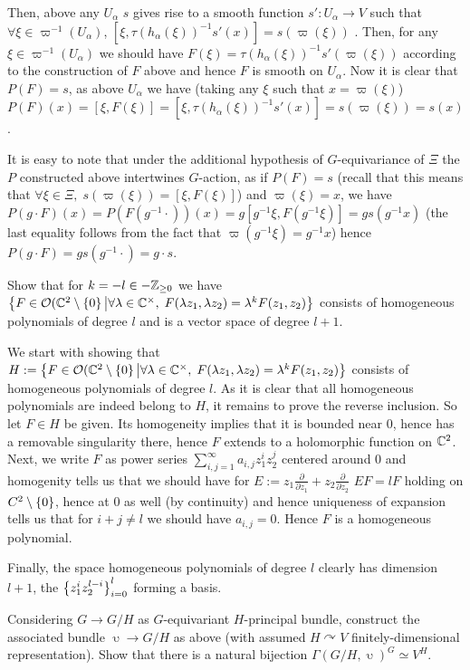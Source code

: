 \documentclass[8pt]{article} %
\newcommand{\myprobshort}[2]{\begin{myprob}[#1]#2\end{myprob}}
\begin{document}
	Then, above any $U_\alpha$ $s$ gives rise to a smooth function $s':U_\alpha\to V$ such that $\forall \xi\in \varpi^{ -1 }
	(U_\alpha)$,
	$[\xi,\tau(h_\alpha(\xi))^{ -1 }s'(x)]=s(\varpi(\xi))$
	. Then, for any $\xi\in\varpi^{ -1 }(U_\alpha)$ we should have
	$F(\xi)=\tau(h_\alpha(\xi))^{ -1 } 
	s'(\varpi(\xi))$ according to the construction of $F$ above and hence $F$ is smooth on $U_\alpha$.
	Now it is clear that $P(F)=s$, as above $U_\alpha$ we have (taking any $\xi$ such that $x=\varpi(\xi)$)
	$P(F)(x)=[\xi,F(\xi)]=[\xi,\tau(h_\alpha(\xi))^{ -1 }s'(x)]=
	s(\varpi(\xi))=s(x)$.\par
 	It is easy to note that under the additional hypothesis of $G$-equivariance of $\Xi$ the $P$ constructed
	above intertwines $G$-action, as if $P(F)=s$ (recall that this means that $\forall \xi\in\Xi,\;s(\varpi(\xi))=[\xi,F(\xi)]
	$)
	and $\varpi(\xi)=x$, we have $P(g\cdot F)(x)=P(F(g^{ -1 }\cdot))(x)=
	g[g^{ -1 }\xi,F(g^{ -1 }\xi)]=gs(g^{ -1 }x)$ (the last equality follows from the fact that $\varpi(g^{ -1 }\xi)=g^{ -1 }x$)
	hence $P(g\cdot F)=gs(g^{ -1 }\cdot)=g\cdot s$.
	\myprobshort{ May 12, Exercise 5.13}{
		Show that for $k=-l\in-\mathbb{Z}_{ \geq0 }$ we have $\left\{ F\in\mathcal{ O }(\mathbb{C}^2\setminus\left\{ 0 \right\} \big| \forall\lambda\in\mathbb{C}^\times,\;F(\lambda z_1,\lambda z_2)=\lambda^{ k }F(z_1,z_2)\right\}$ consists of homogeneous
polynomials of degree $l$ and is a vector space of degree $l+1$.}
We start with showing that 
$H:=\left\{ F\in\mathcal{ O }(\mathbb{C}^2\setminus\left\{ 0 \right\} \big| \forall\lambda\in\mathbb{C}^\times,\;F(\lambda z_1,\lambda z_2)=\lambda^{ k }F(z_1,z_2)\right\}$ consists of homogeneous polynomials of
	degree $l$.
	As it is clear that all homogeneous polynomials are indeed belong to $H$, it remains to prove the reverse inclusion.
	So let $F\in H$ be given. Its homogeneity implies that it is bounded near $0$, hence has a removable singularity there,
	hence $F$ extends to a holomorphic function on $\mathbb{C}^2$. Next, we write $F$ as power series $\sum_{ i,j=1 }^{ \infty }
	a_{ i,j }z_1^iz_2^j$
	centered around $0$ and
	homogenity tells us that we should have for $E:=z_1\frac{ \partial }{ \partial z_1 }+z_2\frac{ \partial }{ \partial z_2 }$
	$EF=lF$ holding on $C^2\setminus\left\{ 0 \right\}$, hence at $0$ as well (by continuity)
	and hence uniqueness of expansion tells us that
	for $i+j\neq l$ we should have $a_{ i,j }=0$. Hence $F$ is a homogeneous polynomial.\par
	Finally, the space homogeneous polynomials of degree $l$ clearly has dimension $l+1$, the $\left\{ z_1^iz_2^{ l-i } \right\}_{ i=0 }
	^l$ forming a basis.
\myprobshort{ April 28, Theorem 5.2.2 }{ Considering $G\to G/H$ as $G$-equivariant $H$-principal bundle,
	construct the associated bundle $\upupsilon\to G/H$
	as above (with assumed $H\curvearrowright V$ finitely-dimensional representation).
	Show that there is a natural bijection $\Gamma(G/H,\upupsilon)^G\simeq V^H$.}
\end{document}
